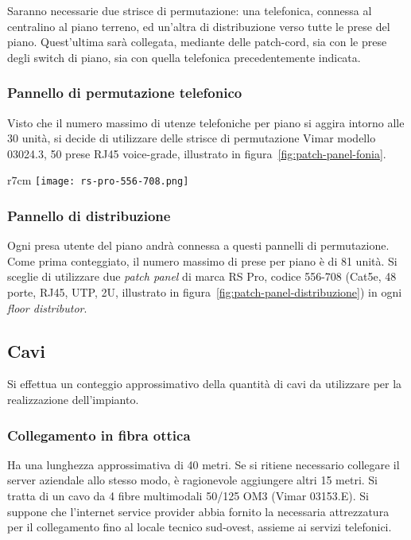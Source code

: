 Saranno necessarie due strisce di permutazione: una telefonica, connessa al centralino al piano terreno,
ed un'altra di distribuzione verso tutte le prese del piano. Quest'ultima sarà collegata, mediante delle patch-cord,
sia con le prese degli switch di piano, sia con quella telefonica precedentemente indicata.

\subsubsection{Pannello di permutazione telefonico}
Visto che il numero massimo di utenze telefoniche per piano si aggira intorno alle 30 unità,
si decide di utilizzare delle strisce di permutazione Vimar modello 03024.3, 50 prese RJ45 voice-grade,
illustrato in figura~\ref{fig:patch-panel-fonia}.
\begin{wrapfigure}{r}{7cm}
  \vspace{3cm}
  \texttt{[image: rs-pro-556-708.png]}
  \caption{Il pannello di permutazione di distribuzione.}\label{fig:patch-panel-distribuzione}
  \vspace{-2cm}
\end{wrapfigure}

\subsubsection{Pannello di distribuzione}
Ogni presa utente del piano andrà connessa a questi pannelli di permutazione. Come prima conteggiato,
il numero massimo di prese per piano è di 81 unità. Si sceglie di utilizzare due \textit{patch panel} di marca
RS Pro, codice 556-708 (Cat5e, 48 porte, RJ45, UTP, 2U, illustrato in figura~\ref{fig:patch-panel-distribuzione})
in ogni \textit{floor distributor}.

\subsection{Cavi}
Si effettua un conteggio approssimativo della quantità di cavi da utilizzare per la realizzazione dell'impianto.

\subsubsection{Collegamento in fibra ottica}
Ha una lunghezza approssimativa di 40 metri. Se si ritiene necessario collegare il server aziendale allo stesso
modo, è ragionevole aggiungere altri 15 metri. Si tratta di un cavo da 4 fibre multimodali 50/125 OM3 (Vimar 03153.E).
Si suppone che l'internet service provider abbia fornito la necessaria attrezzatura per il collegamento fino al
locale tecnico sud-ovest, assieme ai servizi telefonici.

